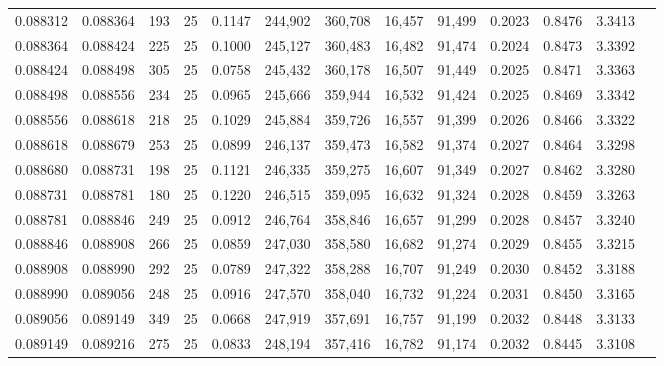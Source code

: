 \begin{tabular}{rrrrrrrrrrrrr}
0.088312 & 0.088364 &   193 &  25 &                                     0.1147 & 244,902 & 360,708 &  16,457 &  91,499 & 0.2023 & 0.8476 & 3.3413 \\
0.088364 & 0.088424 &   225 &  25 &                                     0.1000 & 245,127 & 360,483 &  16,482 &  91,474 & 0.2024 & 0.8473 & 3.3392 \\
0.088424 & 0.088498 &   305 &  25 &                                     0.0758 & 245,432 & 360,178 &  16,507 &  91,449 & 0.2025 & 0.8471 & 3.3363 \\
0.088498 & 0.088556 &   234 &  25 &                                     0.0965 & 245,666 & 359,944 &  16,532 &  91,424 & 0.2025 & 0.8469 & 3.3342 \\
0.088556 & 0.088618 &   218 &  25 &                                     0.1029 & 245,884 & 359,726 &  16,557 &  91,399 & 0.2026 & 0.8466 & 3.3322 \\
0.088618 & 0.088679 &   253 &  25 &                                     0.0899 & 246,137 & 359,473 &  16,582 &  91,374 & 0.2027 & 0.8464 & 3.3298 \\
0.088680 & 0.088731 &   198 &  25 &                                     0.1121 & 246,335 & 359,275 &  16,607 &  91,349 & 0.2027 & 0.8462 & 3.3280 \\
0.088731 & 0.088781 &   180 &  25 &                                     0.1220 & 246,515 & 359,095 &  16,632 &  91,324 & 0.2028 & 0.8459 & 3.3263 \\
0.088781 & 0.088846 &   249 &  25 &                                     0.0912 & 246,764 & 358,846 &  16,657 &  91,299 & 0.2028 & 0.8457 & 3.3240 \\
0.088846 & 0.088908 &   266 &  25 &                                     0.0859 & 247,030 & 358,580 &  16,682 &  91,274 & 0.2029 & 0.8455 & 3.3215 \\
0.088908 & 0.088990 &   292 &  25 &                                     0.0789 & 247,322 & 358,288 &  16,707 &  91,249 & 0.2030 & 0.8452 & 3.3188 \\
0.088990 & 0.089056 &   248 &  25 &                                     0.0916 & 247,570 & 358,040 &  16,732 &  91,224 & 0.2031 & 0.8450 & 3.3165 \\
0.089056 & 0.089149 &   349 &  25 &                                     0.0668 & 247,919 & 357,691 &  16,757 &  91,199 & 0.2032 & 0.8448 & 3.3133 \\
0.089149 & 0.089216 &   275 &  25 &                                     0.0833 & 248,194 & 357,416 &  16,782 &  91,174 & 0.2032 & 0.8445 & 3.3108 \\

\end{tabular}
